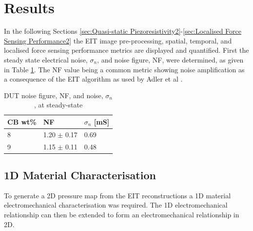 \section{Results}\label{sec: Results}
In the following Sections \ref{sec:Quasi-static Piezoresistivity2}-\ref{sec:Localised Force Sensing Performance2} the EIT image pre-processing, spatial, temporal, and localised force sensing performance metrics are displayed and quantified. First the steady state electrical noise, $\sigma_n$, and noise figure, NF, were determined, as given in Table \ref{table:DUT_noise}. The NF value being a common metric showing noise amplification as a consequence of the EIT algorithm as used by Adler et al \citep{Adler2009}.
\begin{table}[H]
\caption{DUT noise figure, NF, and noise, $\sigma_n$, at steady-state}
\label{table:DUT_noise}
\begin{center}
\begin{tabular}{p{2cm}p{2cm}p{2cm}}
\hline
\textbf{CB wt\%} & \textbf{NF} & $\sigma_n$ [mS]\\ \hline
8           & 1.20 $\pm$ 0.17 & 0.69         \\
9           & 1.15 $\pm$ 0.11 & 0.48            \\ 
\hline
\end{tabular}
\end{center}
\end{table}


\subsection{1D Material Characterisation} \label{sec:1D Material Characterisation2}
To generate a 2D pressure map from the EIT reconstructions a 1D material electromechanical characterisation was required. The 1D electromechanical relationship can then be extended to form an electromechanical relationship in 2D.



